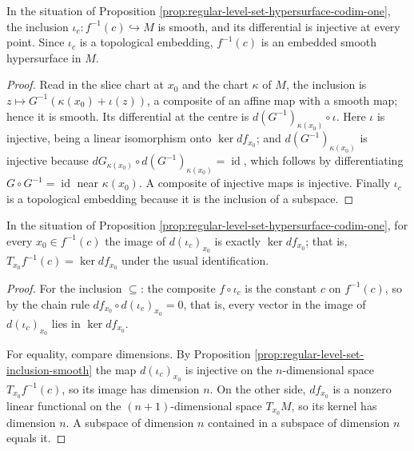 \begin{proposition}
\label{prop:regular-level-set-inclusion-smooth}
\leanok
{}
In the situation of Proposition \ref{prop:regular-level-set-hypersurface-codim-one}, the inclusion $\iota_c : f^{-1}(c) \hookrightarrow M$ is smooth, and its differential is injective at every point. Since $\iota_c$ is a topological embedding, $f^{-1}(c)$ is an embedded smooth hypersurface in $M$.
\end{proposition}

\begin{proof}
\leanok
{}
Read in the slice chart at $x_0$ and the chart $\kappa$ of $M$, the inclusion is $z \mapsto G^{-1}(\kappa(x_0) + \iota(z))$, a composite of an affine map with a smooth map; hence it is smooth. Its differential at the centre is $d(G^{-1})_{\kappa(x_0)} \circ \iota$. Here $\iota$ is injective, being a linear isomorphism onto $\ker df_{x_0}$; and $d(G^{-1})_{\kappa(x_0)}$ is injective because $dG_{\kappa(x_0)} \circ d(G^{-1})_{\kappa(x_0)} = \operatorname{id}$, which follows by differentiating $G \circ G^{-1} = \operatorname{id}$ near $\kappa(x_0)$. A composite of injective maps is injective. Finally $\iota_c$ is a topological embedding because it is the inclusion of a subspace.
\end{proof}

\begin{proposition}
\label{prop:regular-level-set-tangent-kernel}
\leanok
{}
In the situation of Proposition \ref{prop:regular-level-set-hypersurface-codim-one}, for every $x_0 \in f^{-1}(c)$ the image of $d(\iota_c)_{x_0}$ is exactly $\ker df_{x_0}$; that is, $T_{x_0} f^{-1}(c) = \ker df_{x_0}$ under the usual identification.
\end{proposition}

\begin{proof}
\leanok
{}
For the inclusion $\subseteq$: the composite $f \circ \iota_c$ is the constant $c$ on $f^{-1}(c)$, so by the chain rule $df_{x_0} \circ d(\iota_c)_{x_0} = 0$, that is, every vector in the image of $d(\iota_c)_{x_0}$ lies in $\ker df_{x_0}$.

For equality, compare dimensions. By Proposition \ref{prop:regular-level-set-inclusion-smooth} the map $d(\iota_c)_{x_0}$ is injective on the $n$-dimensional space $T_{x_0} f^{-1}(c)$, so its image has dimension $n$. On the other side, $df_{x_0}$ is a nonzero linear functional on the $(n+1)$-dimensional space $T_{x_0}M$, so its kernel has dimension $n$. A subspace of dimension $n$ contained in a subspace of dimension $n$ equals it.
\end{proof}

